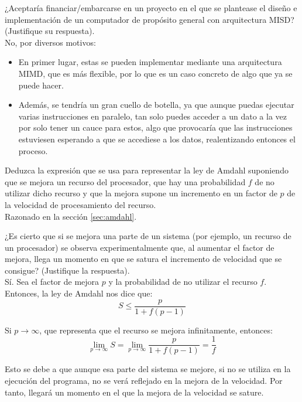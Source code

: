 \begin{cuestion}
    ¿Aceptaría financiar/embarcarse en un proyecto en el que se plantease el diseño e implementación de un
    computador de propósito general con arquitectura MISD? (Justifique su respuesta).\\

    No, por diversos motivos:
    \begin{itemize}
        \item En primer lugar, estas se pueden implementar mediante una arquitectura MIMD, que es más flexible, por lo que es un caso concreto de algo que ya se puede hacer.
        \item Además, se tendría un gran cuello de botella, ya que aunque puedas ejecutar varias instrucciones en paralelo, tan solo puedes acceder a un dato a la vez por solo tener un cauce para estos,
        algo que provocaría que las instrucciones estuviesen esperando a que se accediese a los datos, realentizando entonces el proceso.
    \end{itemize}
\end{cuestion}

\begin{cuestion}
    Deduzca la expresión que se usa para representar la ley de Amdahl suponiendo que se mejora un
    recurso del procesador, que hay una probabilidad $f$ de no utilizar dicho recurso y que la mejora supone
    un incremento en un factor de $p$ de la velocidad de procesamiento del recurso.\\

    Razonado en la sección \ref{sec:amdahl}.
\end{cuestion}

\begin{cuestion}
    ¿Es cierto que si se mejora una parte de un sistema (por ejemplo, un recurso de un procesador) se
    observa experimentalmente que, al aumentar el factor de mejora, llega un momento en que se satura el
    incremento de velocidad que se consigue? (Justifique la respuesta).\\

    Sí. Sea el factor de mejora $p$ y la probabilidad de no utilizar el recurso $f$. Entonces, la ley de Amdahl nos dice que:
    \begin{equation*}
        S \leq \frac{p}{1+f(p-1)}
    \end{equation*}

    Si $p\to\infty$, que representa que el recurso se mejora infinitamente, entonces:
    \begin{equation*}
        \lim_{p\to\infty} S
        = \lim_{p\to\infty} \frac{p}{1+f(p-1)} = \frac{1}{f}
    \end{equation*}

    Esto se debe a que aunque esa parte del sistema se mejore, si no se utiliza en la ejecución del programa, no se verá reflejado en la mejora de la velocidad.
    Por tanto, llegará un momento en el que la mejora de la velocidad se sature.
\end{cuestion}

